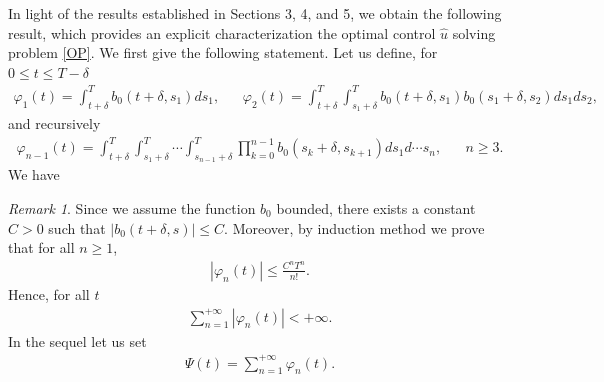 \documentclass[12pt]{article}
\theoremstyle{remark}
\newtheorem{remark}[theorem]{Remark}
\numberwithin{equation}{section}
\begin{document}
In light of the results established in Sections 3, 4, and 5, we obtain the following result, which provides an explicit characterization	 the optimal control $\hat{u}$ solving problem \eqref{OP}. We first give the following statement. Let us define, for $0 \leq t\leq  T-\delta$ 
\begin{eqnarray*}
\varphi_1(t) = \int_{t+\delta}^{T} b_0(t+\delta,s_1)ds_1,\;\;\;\;\;\
\varphi_2(t) = \int_{t+\delta}^T\int_{s_1+\delta}^T b_0(t+\delta,s_1)b_0(s_1+\delta,s_2) ds_1ds_2,
\end{eqnarray*}
and recursively
\begin{eqnarray*}
\varphi_{n-1}(t) = \int_{t+\delta}^T\int_{s_1+\delta}^T\cdots\int_{s_{n-1}+\delta}^T \prod_{k=0}^{n-1} b_0(s_k+\delta,s_{k+1})ds_1d\cdots s_n,\;\;\;\;\;\; n\geq 3.
\end{eqnarray*}
We have 
\begin{remark}
Since we assume the function $b_0$ bounded, there exists a constant $C>0$ such that $|b_0(t+\delta,s)|\leq C$. Moreover, by induction method we prove that
for all $n \geq 1$,
\begin{eqnarray*}
|\varphi_n(t)| \leq \frac{C^n T^n}{n!}.
\end{eqnarray*}
Hence, for all $t$
\begin{eqnarray*}
\sum_{n=1}^{+\infty}|\varphi_n(t)|<+\infty.
\end{eqnarray*}
In the sequel let us set
\begin{eqnarray}\label{Res}
\Psi(t)=\sum_{n=1}^{+\infty}\varphi_n(t).
\end{eqnarray}
\end{remark}
	
\end{document}
